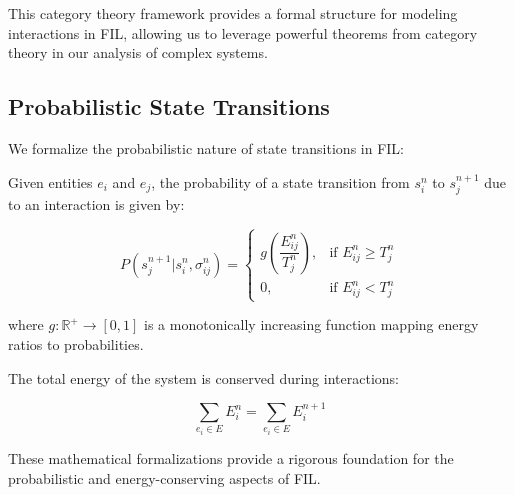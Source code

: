 This category theory framework provides a formal structure for modeling interactions in FIL, allowing us to leverage powerful theorems from category theory in our analysis of complex systems.

\subsection{Probabilistic State Transitions}

We formalize the probabilistic nature of state transitions in FIL:

\begin{definition}
Given entities $e_i$ and $e_j$, the probability of a state transition from $s_i^n$ to $s_j^{n+1}$ due to an interaction is given by:

\begin{equation}\label{eq:state_transition_probability}
P(s_j^{n+1} | s_i^n, \sigma_{ij}^n) =
\begin{cases}
g\left(\dfrac{E_{ij}^n}{T_j^n}\right), & \text{if } E_{ij}^n \geq T_j^n \\
0, & \text{if } E_{ij}^n < T_j^n
\end{cases}
\end{equation}

where $g: \mathbb{R}^+ \rightarrow [0,1]$ is a monotonically increasing function mapping energy ratios to probabilities.
\end{definition}

\begin{proposition}
The total energy of the system is conserved during interactions:

\begin{equation}
\sum_{e_i \in E} E_i^n = \sum_{e_i \in E} E_i^{n+1}
\end{equation}
\end{proposition}

These mathematical formalizations provide a rigorous foundation for the probabilistic and energy-conserving aspects of FIL.


